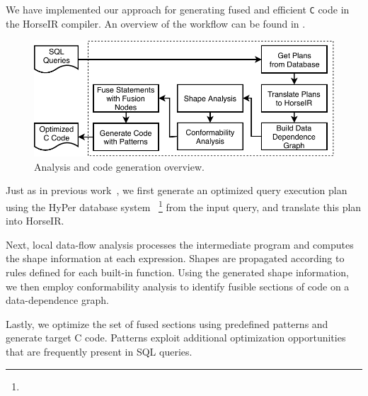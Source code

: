 We have implemented our approach for generating fused and efficient
\texttt{C} code in the HorseIR compiler. An overview of the workflow
can be found in .

\begin{figure}[htbp]
\centering
\includegraphics[width=\columnwidth]{./src/figure/overview-v4.pdf}
\caption{Analysis and code generation overview.} \label{fig:overview}
\end{figure}

Just as in previous work~\OldPaper, we first generate an optimized
query execution plan using the HyPer database system~\cite{Neumann2011:HyPer}
\footnote{}
from the input query, and translate this plan into HorseIR.

Next, local data-flow analysis processes the intermediate program and
computes the shape information at each expression. Shapes are propagated
according to rules defined for each built-in function. Using the
generated shape information, we then employ conformability analysis to
identify fusible sections of code on a data-dependence graph.

Lastly, we optimize the set of fused sections using predefined patterns
and generate target C code. Patterns exploit additional optimization
opportunities that are frequently present in SQL queries.
